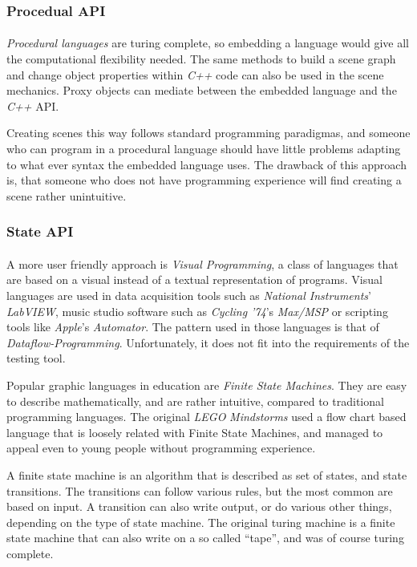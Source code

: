 \subsubsection{Procedual API}
\paragraph{}
\textit{Procedural languages} are turing complete, so embedding a language would give all the computational flexibility needed. The same methods to build a scene graph and change object properties within \textit{C++} code can also be used in the scene mechanics. Proxy objects can mediate between the embedded language and the \textit{C++} API.

Creating scenes this way follows standard programming paradigmas, and someone who can program in a procedural language should have little problems adapting to what ever syntax the embedded language uses. The drawback of this approach is, that someone who does not have programming experience will find creating a scene rather unintuitive.

\subsubsection{State API}
\paragraph{}
A more user friendly approach is \textit{Visual Programming}, a class of languages that are based on a visual instead of a textual representation of programs. Visual languages are used in data acquisition tools such as \textit{National Instruments}' \textit{LabVIEW}, music studio software such as \textit{Cycling '74}'s \textit{Max/MSP} or scripting tools like \textit{Apple}'s \textit{Automator}.
The pattern used in those languages is that of \textit{Dataflow-Programming}\cite{dataflow}. Unfortunately, it does not fit into the requirements of the testing tool.

Popular graphic languages in education are \textit{Finite State Machines}\cite{fsm}. They are easy to describe mathematically, and are rather intuitive, compared to traditional programming languages.
The original \textit{LEGO} \textit{Mindstorms} used a flow chart based language that is loosely related with Finite State Machines, and managed to appeal even to young people without programming experience.

A finite state machine is an algorithm that is described as set of states, and state transitions. The transitions can follow various rules, but the most common are based on input. A transition can also write output, or do various other things, depending on the type of state machine.
The original turing machine is a finite state machine that can also write on a so called ``tape'', and was of course turing complete.

